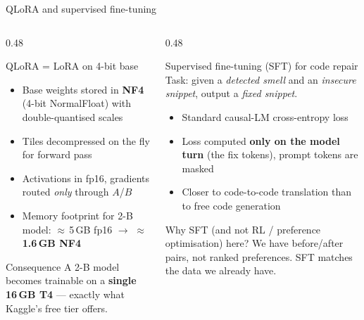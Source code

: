 \documentclass[aspectratio=169, 10pt]{beamer}
\begin{document}
\begin{frame}{QLoRA and supervised fine-tuning}
  \begin{columns}[T]
    \begin{column}{0.48\textwidth}
      \begin{block}{QLoRA = LoRA on 4-bit base}
        \scriptsize
        \begin{itemize}
          \item Base weights stored in \textbf{NF4} (4-bit NormalFloat)
                with double-quantised scales
          \item Tiles decompressed on the fly for forward pass
          \item Activations in fp16, gradients routed \emph{only}
                through $A$/$B$
          \item Memory footprint for 2-B model:
                $\approx$\,5\,GB fp16 $\to$ \textbf{$\approx$\,1.6\,GB NF4}
        \end{itemize}
      \end{block}
      \begin{exampleblock}{Consequence}
        \scriptsize
        A 2-B model becomes trainable on a \textbf{single 16\,GB T4}
        --- exactly what Kaggle's free tier offers.
      \end{exampleblock}
    \end{column}
    \begin{column}{0.48\textwidth}
      \begin{block}{Supervised fine-tuning (SFT) for code repair}
        \scriptsize
        Task: given a \emph{detected smell} and an \emph{insecure snippet},
        output a \emph{fixed snippet}.
        \begin{itemize}
          \item Standard causal-LM cross-entropy loss
          \item Loss computed \textbf{only on the model turn}
                (the fix tokens), prompt tokens are masked
          \item Closer to code-to-code translation than to free
                code generation
        \end{itemize}
      \end{block}
      \begin{alertblock}{Why SFT (and not RL / preference optimisation) here?}
        \scriptsize
        We have before/after pairs, not ranked preferences.
        SFT matches the data we already have.
      \end{alertblock}
    \end{column}
  \end{columns}
\end{frame}
\end{document}
